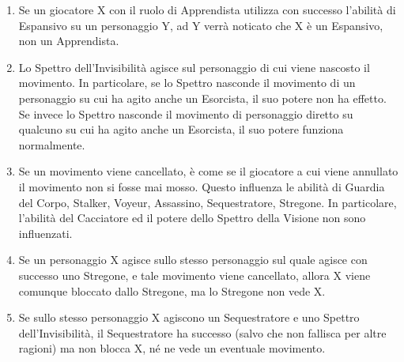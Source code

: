 \documentclass[a4paper,10pt]{article}
\begin{document}
\begin{enumerate}
	\item Se un giocatore X con il ruolo di Apprendista utilizza con successo l'abilità di Espansivo su un personaggio Y, ad Y verrà noticato che X è un Espansivo, non un Apprendista.

	\item Lo Spettro dell'Invisibilità agisce sul personaggio di cui viene nascosto il movimento. In particolare, se lo Spettro nasconde il movimento di un personaggio su cui ha agito anche un Esorcista, il suo potere non ha effetto. Se invece lo Spettro nasconde il movimento di personaggio diretto su qualcuno su cui ha agito anche un Esorcista, il suo potere funziona normalmente.



	\item Se un movimento viene cancellato, è come se il giocatore a cui viene annullato il movimento non si fosse mai mosso. Questo influenza le abilità di Guardia del Corpo, Stalker, Voyeur, Assassino, Sequestratore, Stregone. In particolare, l'abilità del Cacciatore ed il potere dello Spettro della Visione non sono influenzati.

	\item Se un personaggio X agisce sullo stesso personaggio sul quale agisce con successo uno Stregone, e tale movimento viene cancellato, allora X viene comunque bloccato dallo Stregone, ma lo Stregone non vede X.

	\item Se sullo stesso personaggio X agiscono un Sequestratore e uno Spettro dell'Invisibilità, il Sequestratore ha successo (salvo che non fallisca per altre ragioni) ma non blocca X, né ne vede un eventuale movimento.


\end{enumerate}
\end{document}
